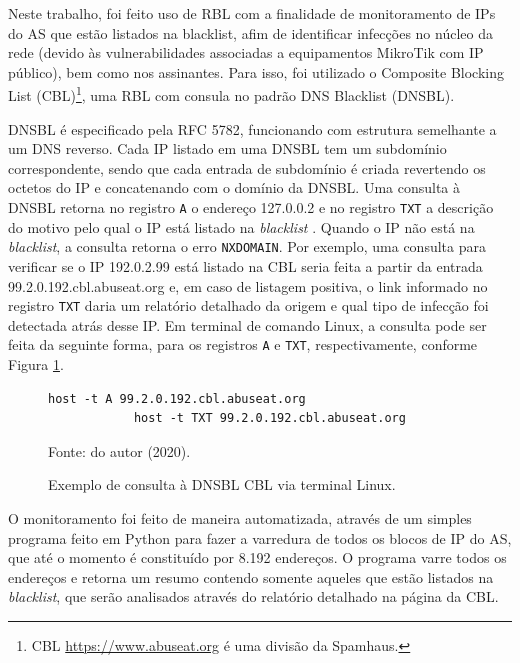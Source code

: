     Neste trabalho, foi feito uso de RBL com a finalidade de monitoramento de IPs do AS que estão listados na blacklist, afim de identificar infecções no núcleo da rede (devido às vulnerabilidades associadas a equipamentos MikroTik com IP público), bem como nos assinantes. Para isso, foi utilizado o Composite Blocking List (CBL)\footnote{CBL \url{https://www.abuseat.org} é uma divisão da Spamhaus.}, uma RBL com consula no padrão DNS Blacklist (DNSBL).
    
    DNSBL é especificado pela RFC 5782, funcionando com estrutura semelhante a um DNS reverso. Cada IP listado em uma DNSBL tem um subdomínio correspondente, sendo que cada entrada de subdomínio é criada revertendo os octetos do IP e concatenando com o domínio da DNSBL. Uma consulta à DNSBL retorna no registro {\tt A} o endereço 127.0.0.2 e no registro {\tt TXT} a descrição do motivo pelo qual o IP está listado na \textit{blacklist} \cite{rfc5782}. Quando o IP não está na \textit{blacklist}, a consulta retorna o erro {\tt NXDOMAIN}. Por exemplo, uma consulta para verificar se o IP 192.0.2.99 está listado na CBL seria feita a partir da entrada 99.2.0.192.cbl.abuseat.org e, em caso de listagem positiva, o link informado no registro {\tt TXT} daria um relatório detalhado da origem e qual tipo de infecção foi detectada atrás desse IP. Em terminal de comando Linux, a consulta pode ser feita da seguinte forma, para os registros {\tt A} e {\tt TXT}, respectivamente, conforme Figura \ref{fig:dnsbl_query}.
    
    \begin{figure}[!htb]
        \centering
        \caption{Exemplo de consulta à DNSBL CBL via terminal Linux.} 
        \label{fig:dnsbl_query}
        
        \begin{Verbatim}[fontsize=\normalsize]
            host -t A 99.2.0.192.cbl.abuseat.org
            host -t TXT 99.2.0.192.cbl.abuseat.org
        \end{Verbatim} 

        {\small Fonte: do autor (2020).} 
    \end{figure}
    
    O monitoramento foi feito de maneira automatizada, através de um simples programa feito em Python para fazer a varredura de todos os blocos de IP do AS, que até o momento é constituído por 8.192 endereços. O programa varre todos os endereços e retorna um resumo contendo somente aqueles que estão listados na \textit{blacklist}, que serão analisados através do relatório detalhado na página da CBL.
    
